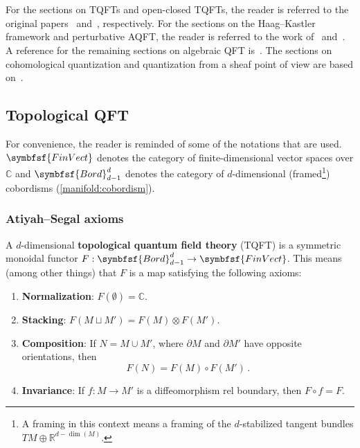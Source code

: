 \chapter{}

    For the sections on TQFTs and open-closed TQFTs, the reader is referred to the original papers~\citet{atiyah_topological_1988} and~\citet{lauda_openclosed_2008}, respectively. For the sections on the Haag--Kastler framework and perturbative AQFT, the reader is referred to the work of~\citet{brunetti_generally_2003} and~\citet{rejzner_perturbative_2016,fewster_algebraic_2020}. A reference for the remaining sections on algebraic QFT is~\citet{baez_introduction_2014}. The sections on cohomological quantization and quantization from a sheaf point of view are based on~\citet{nuiten_cohomological_2013}.

    \minitoc

\section{Topological QFT}\label{section:tqft}

    For convenience, the reader is reminded of some of the notations that are used. $\symbfsf{FinVect}$ denotes the category of finite-dimensional vector spaces over $\mathbb{C}$ and $\symbfsf{Bord}^d_{d-1}$ denotes the category of $d$-dimensional (framed\footnote{A framing in this context means a framing of the $d$-stabilized tangent bundles $TM\oplus\mathbb{R}^{d-\dim(M)}$.}) cobordisms (\cref{manifold:cobordism}).

\subsection{Atiyah--Segal axioms}

    \begin{axiom}
        A $d$-dimensional \textbf{topological quantum field theory} (TQFT) is a symmetric monoidal functor $F:\symbfsf{Bord}_{d-1}^d\rightarrow\symbfsf{FinVect}$. This means (among other things) that $F$ is a map satisfying the following axioms:
        \begin{enumerate}
            \item\textbf{Normalization}: $F(\emptyset)=\mathbb{C}$.
            \item\textbf{Stacking}: $F(M\sqcup M') = F(M)\otimes F(M')$.
            \item\textbf{Composition}: If $N=M\cup M'$, where $\partial M$ and $\partial M'$ have opposite orientations, then \[F(N) = F(M)\circ F(M')\,.\]
            \item\textbf{Invariance}: If $f: M\rightarrow M'$ is a diffeomorphism rel boundary, then $F\circ f = F$.
        \end{enumerate}
    \end{axiom}

